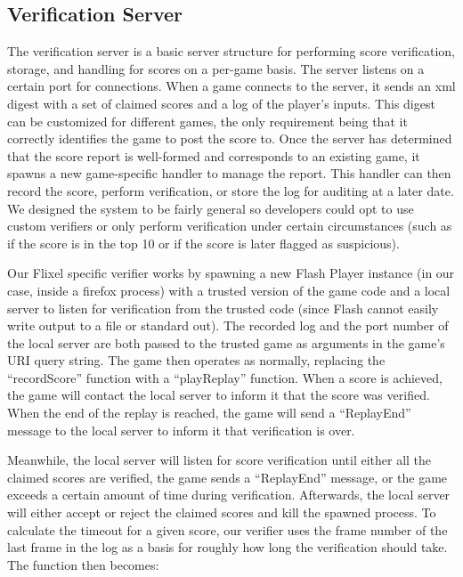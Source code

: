 \documentclass [11pt, twocolumn] {article}
\begin{document}
\subsection { Verification Server } 

The verification server is a basic server structure for performing score verification, storage, and handling for scores on a per-game basis. The server listens on a certain port for connections. When a game connects to the server, it sends an xml digest with a set of claimed scores and a log of the player's inputs. This digest can be customized for different games, the only requirement being that it correctly identifies the game to post the score to. Once the server has determined that the score report is well-formed and corresponds to an existing game, it spawns a new game-specific handler to manage the report. This handler can then record the score, perform verification, or store the log for auditing at a later date. We designed the system to be fairly general so developers could opt to use custom verifiers or only perform verification under certain circumstances (such as if the score is in the top 10 or if the score is later flagged as suspicious). 
 
Our Flixel specific verifier works by spawning a new Flash Player instance (in our case, inside a firefox process) with a trusted version of the game code and a local server to listen for verification from the trusted code (since Flash cannot easily write output to a file or standard out). The recorded log and the port number of the local server are both passed to the trusted game as arguments in the game's URI query string. The game then operates as normally, replacing the ``recordScore'' function with a ``playReplay'' function. When a score is achieved, the game will contact the local server to inform it that the score was verified. When the end of the replay is reached, the game will send a ``ReplayEnd'' message to the local server to inform it that verification is over. 

Meanwhile, the local server will listen for score verification until either all the claimed scores are verified, the game sends a ``ReplayEnd'' message, or the game exceeds a certain amount of time during verification. Afterwards, the local server will either accept or reject the claimed scores and kill the spawned process. To calculate the timeout for a given score, our verifier uses the frame number of the last frame in the log as a basis for roughly how long the verification should take. The function then becomes: 
\end{document}
